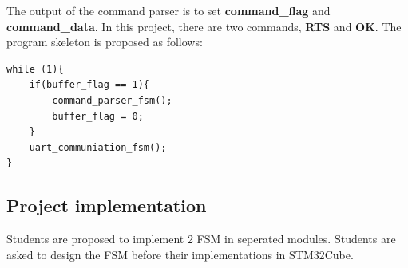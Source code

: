 The output of the command parser is to set \textbf{command\_flag} and \textbf{command\_data}. In this project, there are two commands, \textbf{RTS} and \textbf{OK}. The program skeleton is proposed as follows:
\begin{lstlisting}[caption= Program structure]
while (1){
    if(buffer_flag == 1){
        command_parser_fsm();
        buffer_flag = 0;
    }
    uart_communiation_fsm();
}
\end{lstlisting}

\subsection{Project implementation}
Students are proposed to implement 2 FSM in seperated modules. Students are asked to design the FSM before their implementations in STM32Cube.
